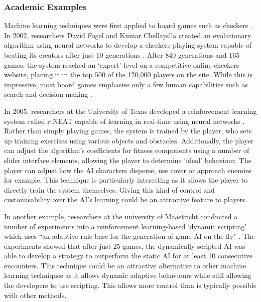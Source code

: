 \documentclass[a4paper,oneside]{report}
\begin{document}
\subsubsection{Academic Examples}

Machine learning techniques were first applied to board games such as checkers \cite{Samuel:1959qo, Samuel:1967ye}. In 2002, researchers David Fogel and Kumar Chellapilla created an evolutionary algorithm using neural networks to develop a checkers-playing system capable of beating its creators after just 10 generations \cite{Fogel:2003fk}. After 840 generations and 165 games, the system reached an `expert' level on a competitive online checkers website, placing it in the top 500 of the 120,000 players on the site. While this is impressive, most board games emphasise only a few human capabilities such as search and decision-making \cite{Laird:2001tw}. 

In 2005, researchers at the University of Texas developed a reinforcement learning system called rtNEAT capable of learning in real-time using neural networks \cite{Stanley:2005ff}. Rather than simply playing games, the system is trained by the player, who sets up training exercises using various objects and obstacles. Additionally, the player can adjust the algorithm's coefficients for fitness components using a number of slider interface elements, allowing the player to determine `ideal' behaviour. The player can adjust how the AI characters disperse, use cover or approach enemies for example. This technique is particularly interesting as it allows the player to directly train the system themselves. Giving this kind of control and customisability over the AI's learning could be an attractive feature to players. 

In another example, researchers at the university of Maastricht conducted a number of experiments into a reinforcement learning-based `dynamic scripting' which uses ``an adaptive rule-base for the generation of game AI on the fly" \cite{Spronck:2005fu}. The experiments showed that after just 25 games, the dynamically scripted AI was able to develop a strategy to outperform the static AI for at least 10 consecutive encounters. This technique could be an attractive alternative to other machine learning techniques as it allows dynamic adaptive behaviours while still allowing the developers to use scripting. This allows more control than is typically possible with other methods.
\end{document}
